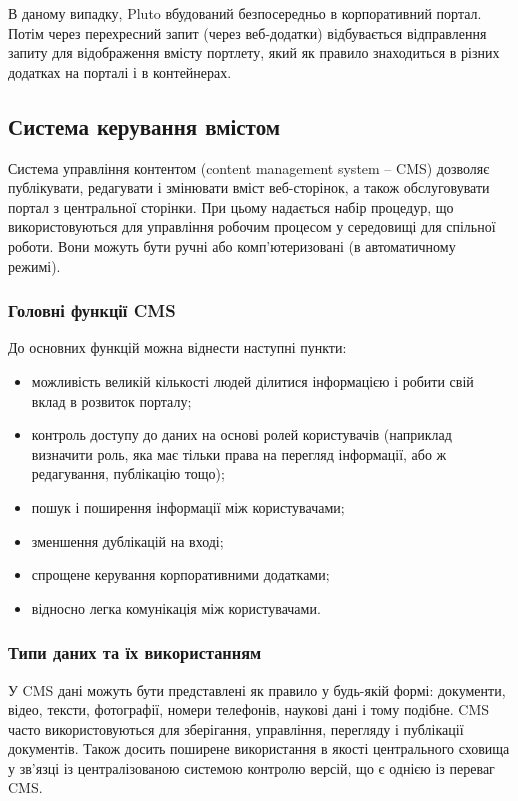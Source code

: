 \par В даному випадку, Pluto вбудований безпосередньо в корпоративний портал. 
Потім через перехресний запит (через веб-додатки) відбувається відправлення запиту для відображення вмісту портлету, який як правило знаходиться в різних додатках на порталі і в контейнерах. 

\subsection{Система керування вмістом}
Система управління контентом (content management system -- CMS) дозволяє публікувати, редагувати і змінювати вміст веб-сторінок, а також обслуговувати портал з центральної сторінки. 
При цьому надається набір процедур, що використовуються для управління робочим процесом у середовищі для спільної роботи.
Вони можуть бути ручні або комп'ютеризовані (в автоматичному режимі).
\subsubsection{Головні функції CMS}
До основних функцій можна віднести наступні пункти:
\begin{itemize}
\item можливість великій кількості людей ділитися інформацією і робити свій вклад в розвиток порталу;
\item контроль доступу до даних на основі ролей користувачів (наприклад визначити роль, яка має тільки права на перегляд інформації, або ж редагування, публікацію тощо);
\item пошук і поширення інформації між користувачами;
\item зменшення дублікацій на вході;
\item спрощене керування корпоративними додатками;
\item відносно легка комунікація між користувачами.
\end{itemize}

\subsubsection{Типи даних та їх використанням}
У CMS дані можуть бути представлені як правило у будь-якій формі: документи, відео, тексти, фотографії, номери телефонів, наукові дані і тому подібне. 
CMS часто використовуються для зберігання, управління, перегляду і публікації документів. 
Також досить поширене використання в якості центрального сховища у зв'язці із централізованою системою контролю версій, що є однією із переваг CMS.
